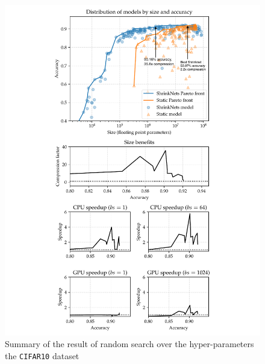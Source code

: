 \begin{figure}[t]\centering
\begin{minipage}{2.7in}
\begin{center}
\includegraphics[width=\columnwidth]{CIFAR10_VGG_summary-arrows}
\vspace*{-5mm}
\caption{\label{figure_CIFAR10} Summary of the result of random
search over the hyper-parameters the \texttt{CIFAR10} dataset}
\end{center}
\vspace*{-4mm}
\end{minipage}
\begin{minipage}{2.7in}
\begin{center}

\end{center}
\end{minipage}
\end{figure}
